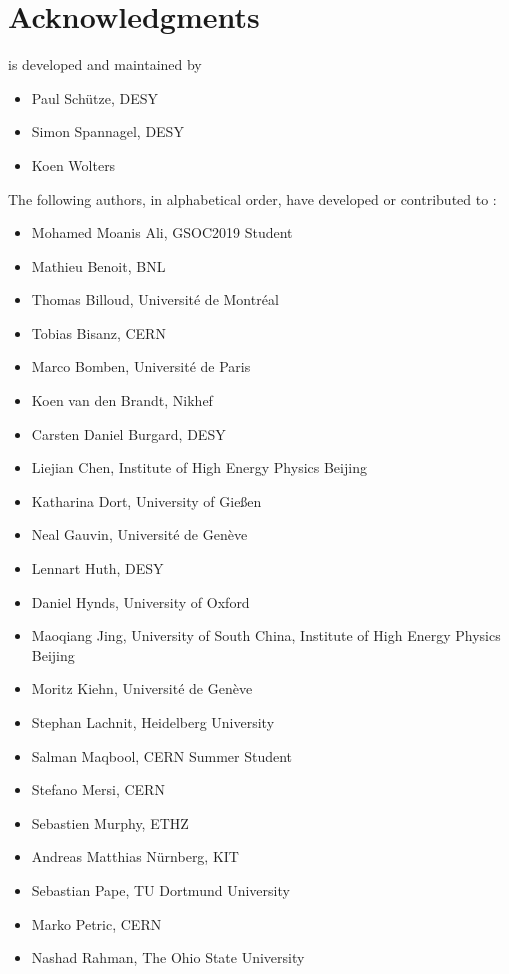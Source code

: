 \chapter{Acknowledgments}

\apsq is developed and maintained by

\begin{itemize}
    \item Paul Schütze, DESY
    \item Simon Spannagel, DESY
    \item Koen Wolters
\end{itemize}

The following authors, in alphabetical order, have developed or contributed to \apsq:

\begin{itemize}
\item Mohamed Moanis Ali, GSOC2019 Student
\item Mathieu Benoit, BNL
\item Thomas Billoud, Université de Montréal
\item Tobias Bisanz, CERN
\item Marco Bomben, Université de Paris
\item Koen van den Brandt, Nikhef
\item Carsten Daniel Burgard, DESY
\item Liejian Chen, Institute of High Energy Physics Beijing
\item Katharina Dort, University of Gie\ss en
\item Neal Gauvin, Université de Genève
\item Lennart Huth, DESY
\item Daniel Hynds, University of Oxford
\item Maoqiang Jing, University of South China, Institute of High Energy Physics Beijing
\item Moritz Kiehn, Université de Genève
\item Stephan Lachnit, Heidelberg University
\item Salman Maqbool, CERN Summer Student
\item Stefano Mersi, CERN
\item Sebastien Murphy, ETHZ
\item Andreas Matthias Nürnberg, KIT
\item Sebastian Pape, TU Dortmund University
\item Marko Petric, CERN
\item Nashad Rahman, The Ohio State University

\end{itemize}
